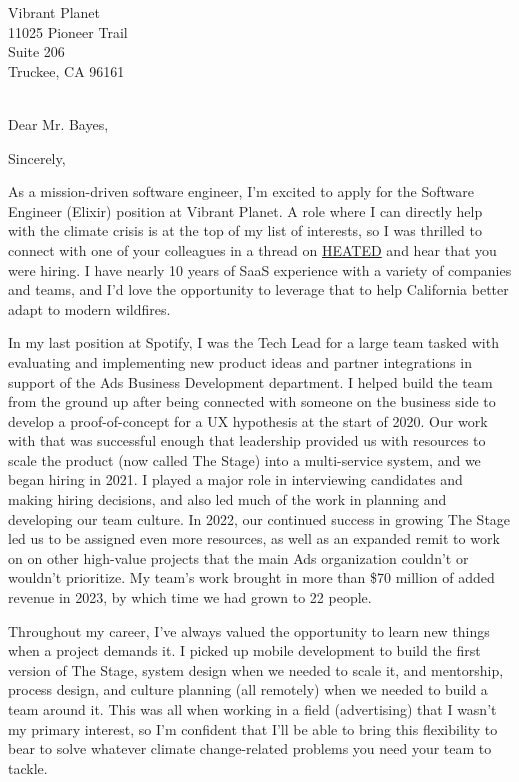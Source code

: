 

	{Vibrant Planet
	\\11025 Pioneer Trail
    \\Suite 206
	\\Truckee, CA 96161}

\date{February 19, 2024}
\opening{\\Dear Mr. Bayes,}
\closing{Sincerely,}
\makelettertitle

As a mission-driven software engineer, I'm excited to apply for the Software Engineer (Elixir) position at Vibrant Planet.
A role where I can directly help with the climate crisis is at the top of my list of interests,
so I was thrilled to connect with one of your colleagues in a thread on \href{https://heated.world/}{HEATED} and hear that you were hiring.
I have nearly 10 years of SaaS experience with a variety of companies and teams,
and I'd love the opportunity to leverage that to help California better adapt to modern wildfires.

In my last position at Spotify, I was the Tech Lead for a large team tasked with evaluating and implementing new product ideas
and partner integrations in support of the Ads Business Development department.
I helped build the team from the ground up after being connected with someone on the business side to develop a proof-of-concept
for a UX hypothesis at the start of 2020. Our work with that was successful enough that leadership provided us with resources
to scale the product (now called The Stage) into a multi-service system, and we began hiring in 2021.
I played a major role in interviewing candidates and making hiring decisions,
and also led much of the work in planning and developing our team culture.
In 2022, our continued success in growing The Stage led us to be assigned even more resources,
as well as an expanded remit to work on on other high-value projects that the main Ads organization couldn't or wouldn't prioritize.
My team's work brought in more than \$70 million of added revenue in 2023, by which time we had grown to 22 people.

Throughout my career, I've always valued the opportunity to learn new things when a project demands it.
I picked up mobile development to build the first version of The Stage, system design when we needed to scale it,
and mentorship, process design, and culture planning (all remotely) when we needed to build a team around it.
This was all when working in a field (advertising) that I wasn't my primary interest,
so I'm confident that I'll be able to bring this flexibility to bear to solve whatever climate change-related problems
you need your team to tackle.

